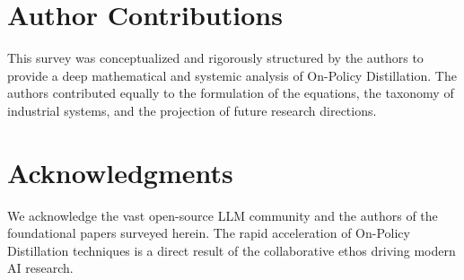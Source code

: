 \section*{Author Contributions}
This survey was conceptualized and rigorously structured by the authors to provide a deep mathematical and systemic analysis of On-Policy Distillation. The authors contributed equally to the formulation of the equations, the taxonomy of industrial systems, and the projection of future research directions.

\section*{Acknowledgments}
We acknowledge the vast open-source LLM community and the authors of the foundational papers surveyed herein. The rapid acceleration of On-Policy Distillation techniques is a direct result of the collaborative ethos driving modern AI research.




